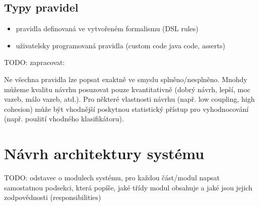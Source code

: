 \subsection{Typy pravidel}
\begin{itemize}
\item pravidla definovaná ve vytvořeném formalismu (DSL rules)
\item uživatelsky programovaná pravidla (custom code java code, asserts)
\end{itemize}

TODO: zapracovat:

Ne všechna pravidla lze popsat exaktně ve smyslu splněno/nesplněno. Mnohdy můžeme kvalitu návrhu posuzovat pouze kvantitativně (dobrý návrh, lepší, moc vazeb, málo vazeb, atd.). Pro některé vlastnosti návrhu (např. low coupling, high cohesion) může být vhodnější poskytnou statistický přístup pro vyhodnocování (např. použití vhodného klasifikátoru).

\section{Návrh architektury systému}
\label{design-architecture}
TODO: odstavec o modulech systému, pro každou část/modul napsat samostatnou podsekci, která popíše, jaké třídy modul obsahuje a jaké jsou jejich zodpovědnosti (responsibilities)


